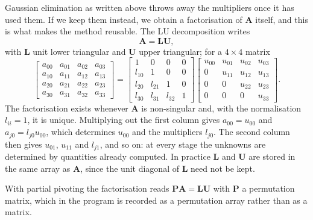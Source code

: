 Gaussian elimination as written above throws away the multipliers once it has
used them.  If we keep them instead, we obtain a factorisation of $\bm{A}$
itself, and this is what makes the method reusable.  The LU decomposition
writes
\begin{equation}
  \bm{A} = \bm{L}\bm{U},
  \label{eq:1-lu}
\end{equation}
with $\bm{L}$ unit lower triangular and $\bm{U}$ upper triangular; for a
$4\times 4$ matrix
\begin{equation}
  \begin{bmatrix}
    a_{00} & a_{01} & a_{02} & a_{03}\\
    a_{10} & a_{11} & a_{12} & a_{13}\\
    a_{20} & a_{21} & a_{22} & a_{23}\\
    a_{30} & a_{31} & a_{32} & a_{33}
  \end{bmatrix}
  =
  \begin{bmatrix}
    1      & 0      & 0      & 0\\
    l_{10} & 1      & 0      & 0\\
    l_{20} & l_{21} & 1      & 0\\
    l_{30} & l_{31} & l_{32} & 1
  \end{bmatrix}
  \begin{bmatrix}
    u_{00} & u_{01} & u_{02} & u_{03}\\
    0      & u_{11} & u_{12} & u_{13}\\
    0      & 0      & u_{22} & u_{23}\\
    0      & 0      & 0      & u_{33}
  \end{bmatrix} .
  \label{eq:1-lu4}
\end{equation}
The factorisation exists whenever $\bm{A}$ is non-singular and, with the
normalisation $l_{ii}=1$, it is unique.  Multiplying out the first column
gives $a_{00}=u_{00}$ and $a_{j0}=l_{j0}u_{00}$, which determines $u_{00}$ and
the multipliers $l_{j0}$.  The second column then gives $u_{01}$, $u_{11}$ and
$l_{j1}$, and so on: at every stage the unknowns are determined by quantities
already computed.  In practice $\bm{L}$ and $\bm{U}$ are stored in the same
array as $\bm{A}$, since the unit diagonal of $\bm{L}$ need not be kept.

With partial pivoting the factorisation reads $\bm{P}\bm{A}=\bm{L}\bm{U}$
with $\bm{P}$ a permutation matrix, which in the program is recorded as a
permutation array rather than as a matrix.

